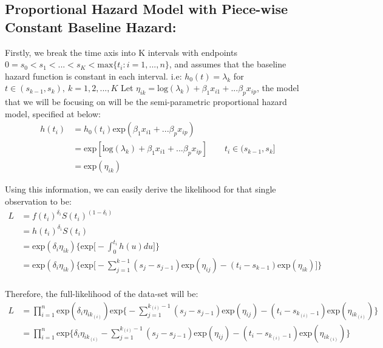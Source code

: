 \documentclass[]{article}
\begin{document}
\hypertarget{proportional-hazard-model-with-piece-wise-constant-baseline-hazard}{%
\subsection{Proportional Hazard Model with Piece-wise Constant Baseline
Hazard:}\label{proportional-hazard-model-with-piece-wise-constant-baseline-hazard}}

Firstly, we break the time axis into K intervals with endpoints
\(0=s_0<s_1<...<s_K < \text{max}\{t_i:i=1,...,n\}\), and assumes that
the baseline hazard function is constant in each interval. i.e:
\(h_0(t) = \lambda_k\) for \(t\in(s_{k-1},s_k), \ k=1,2, ...,K\) Let
\(\eta_{ik} = \text{log}(\lambda_k)+\beta_1x_{i1}+...\beta_px_{ip}\),
the model that we will be focusing on will be the semi-parametric
proportional hazard model, specified at below:
\begin{equation}\begin{aligned}\label{eqn:phmodel}
h(t_i) &= h_0(t_i)\text{exp}(\beta_1x_{i1}+...\beta_px_{ip})\\
       &= \text{exp}[\text{log}(\lambda_k)+\beta_1x_{i1}+...\beta_px_{ip}] \qquad t_i\in(s_{k-1},s_k] \\
       &= \text{exp}(\eta_{ik})
\end{aligned}\end{equation}

Using this information, we can easily derive the likelihood for that
single observation to be:
\begin{equation}\begin{aligned}\label{eqn:singlelike}
L &= f(t_i)^{\delta_i}S(t_i)^{(1- \delta_i)}\\
  &= h(t_i)^{\delta_i}S(t_i) \\
  &= \text{exp}(\delta_i \eta_{ik})\bigg\{ \text{exp} \big[ -\int_{0}^{t_i} h(u) du\big ] \bigg\} \\
  &= \text{exp}(\delta_i \eta_{ik})\bigg \{\text{exp}\big[-\sum_{j=1}^{k-1} (s_{j}-s_{j-1})\text {exp} (\eta_{ij}) - (t_i-s_{k-1})\text{exp}(\eta_{ik})\big]\bigg \}\\
\end{aligned}\end{equation}

Therefore, the full-likelihood of the data-set will be:
\begin{equation}\begin{aligned}\label{eqn:fulllike}
L &=  \prod_{i=1}^{n} \text{exp}(\delta_i \eta_{ik_{(i)}}) \text{exp} \bigg\{-\sum_{j=1}^{k_{(i)}-1} (s_{j}-s_{j-1})\text{exp}(\eta_{ij})-(t_i - s_{k_{(i)}-1})\text{exp}(\eta_{ik_{(i)}})\bigg \} \\
  &= \prod_{i=1}^{n} \text{exp} \big \{\delta_i \eta_{ik_{(i)}} -\sum_{j=1}^{k_{(i)}-1} (s_{j}-s_{j-1})\text{exp}(\eta_{ij})-(t_i - s_{k_{(i)}-1})\text{exp}(\eta_{ik_{(i)}}) \big \}
\end{aligned}\end{equation}
\end{document}
